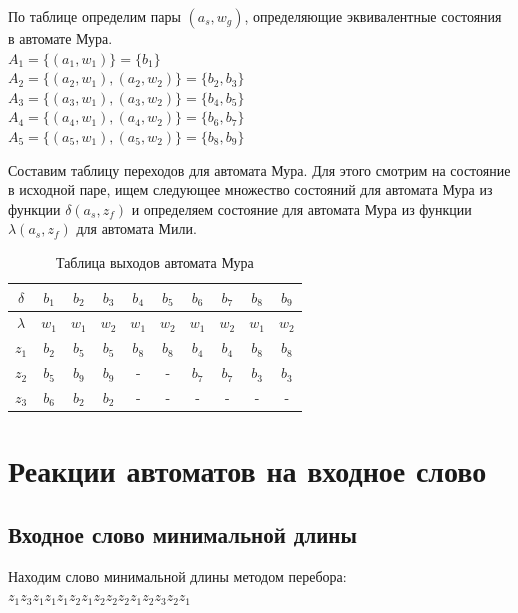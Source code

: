         По таблице определим пары $(a_s, w_g)$, определяющие эквивалентные состояния в автомате Мура. \\
        $A_1 = \{ (a_1, w_1) \} = \{ b_1 \}$ \\
        $A_2 = \{ (a_2, w_1), (a_2, w_2) \} = \{ b_2, b_3 \}$ \\
        $A_3 = \{ (a_3, w_1), (a_3, w_2) \} = \{ b_4, b_5 \}$ \\
        $A_4 = \{ (a_4, w_1), (a_4, w_2) \} = \{ b_6, b_7 \}$ \\
        $A_5 = \{ (a_5, w_1), (a_5, w_2) \} = \{ b_8, b_9 \}$


        Составим таблицу переходов для автомата Мура. Для этого смотрим на состояние в исходной паре,
        ищем следующее множество состояний для автомата Мура из функции $\delta(a_s, z_f)$ и определяем
        состояние для автомата Мура из функции $\lambda(a_s, z_f)$ для автомата Мили.

        \begin{table}[!h]
        \centering
            \begin{tabular} {|c|c|c|c|c|c|c|c|c|c|} \hline $\delta$  & $b_1$ & $b_2$ & $b_3$ & $b_4$ & $b_5$ & $b_6$ & $b_7$ & $b_8$ & $b_9$ \\ \hline
                $\lambda$ & $w_1$ & $w_1$ & $w_2$ & $w_1$ & $w_2$ & $w_1$ & $w_2$ & $w_1$ & $w_2$ \\ \hline
                $z_1$     & $b_2$ & $b_5$ & $b_5$ & $b_8$ & $b_8$ & $b_4$ & $b_4$ & $b_8$ & $b_8$ \\ \hline
                $z_2$     & $b_5$ & $b_9$ & $b_9$ & -     & -     & $b_7$ & $b_7$ & $b_3$ & $b_3$ \\ \hline
                $z_3$     & $b_6$ & $b_2$ & $b_2$ & -     & -     & -     & -     & -     & -     \\ \hline
            \end{tabular}
            \caption{Таблица выходов автомата Мура}
        \end{table}

\section{Реакции автоматов на входное слово}
        \subsection{Входное слово минимальной длины}
		Находим слово минимальной длины методом перебора: \\
            $z_1 z_3 z_1 z_1 z_1 z_2 z_1 z_2 z_2 z_2 z_1 z_2 z_3 z_2 z_1$
